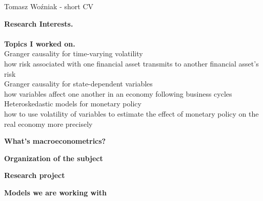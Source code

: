 \documentclass[notes,blackandwhite,mathsans]{beamer}
\begin{document}
{
\begin{frame}{Tomasz Wo\'zniak - short CV}

\textbf{Research Interests.}\\
\\




\vspace{0.5cm}\textbf{Topics I worked on.}\\[0.5ex]
{\small
Granger causality for time-varying volatility \\
{\color{mcxs2}how risk associated with one financial asset transmits to another financial asset's risk}\\[1.5ex]
Granger causality for state-dependent variables \\
{\color{mcxs2}how variables affect one another in an economy following business cycles}\\[1.5ex]
Heteroskedastic models for monetary policy \\
{\color{mcxs2}how to use volatility of variables to estimate the effect of monetary policy on the real economy more precisely }
}
\end{frame}
}




{
\begin{frame}

\bigskip\textbf{\color{mcxs3}What's macroeconometrics?}

\bigskip\textbf{\color{mcxs3}Organization of the subject}

\bigskip\textbf{\color{mcxs1}Research project}

\bigskip\textbf{\color{mcxs3}Models we are working with}

\end{frame}
}
\end{document}
